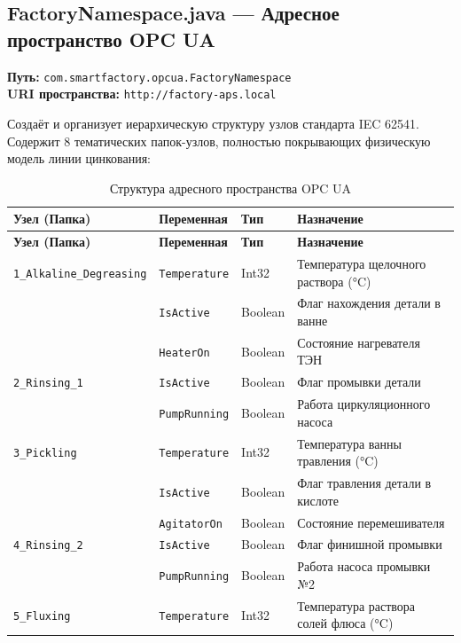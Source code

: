 \documentclass[14pt, a4paper]{extarticle}
\begin{document}
\subsection{FactoryNamespace.java --- Адресное пространство OPC UA}

\textbf{Путь:} \texttt{com.smartfactory.opcua.FactoryNamespace}\\
\textbf{URI пространства:} \texttt{http://factory-aps.local}

Создаёт и организует иерархическую структуру узлов стандарта IEC 62541. Содержит 8 тематических папок-узлов, полностью покрывающих физическую модель линии цинкования:

\begin{longtable}{|l|l|l|p{6cm}|}
\caption{Структура адресного пространства OPC UA} \\
\hline
\textbf{Узел (Папка)} & \textbf{Переменная} & \textbf{Тип} & \textbf{Назначение} \\
\hline
\endfirsthead
\hline
\textbf{Узел (Папка)} & \textbf{Переменная} & \textbf{Тип} & \textbf{Назначение} \\
\hline
\endhead
\hline
\endfoot
\texttt{1\_Alkaline\_Degreasing} & \texttt{Temperature} & Int32 & Температура щелочного раствора (°C) \\
& \texttt{IsActive} & Boolean & Флаг нахождения детали в ванне \\
& \texttt{HeaterOn} & Boolean & Состояние нагревателя ТЭН \\
\hline
\texttt{2\_Rinsing\_1} & \texttt{IsActive} & Boolean & Флаг промывки детали \\
& \texttt{PumpRunning} & Boolean & Работа циркуляционного насоса \\
\hline
\texttt{3\_Pickling} & \texttt{Temperature} & Int32 & Температура ванны травления (°C) \\
& \texttt{IsActive} & Boolean & Флаг травления детали в кислоте \\
& \texttt{AgitatorOn} & Boolean & Состояние перемешивателя \\
\hline
\texttt{4\_Rinsing\_2} & \texttt{IsActive} & Boolean & Флаг финишной промывки \\
& \texttt{PumpRunning} & Boolean & Работа насоса промывки №2 \\
\hline
\texttt{5\_Fluxing} & \texttt{Temperature} & Int32 & Температура раствора солей флюса (°C) \\

\end{longtable}
\end{document}
